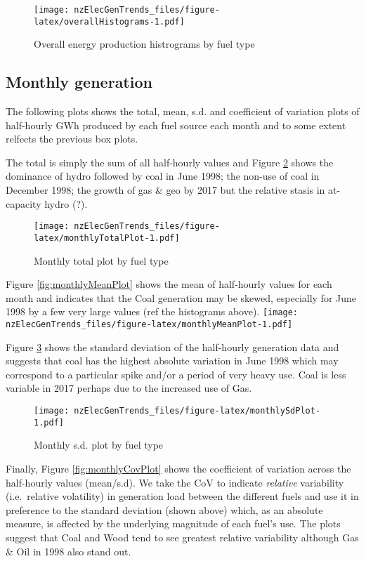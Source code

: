 \documentclass[]{article}
\theoremstyle{definition}
\theoremstyle{definition}
\theoremstyle{definition}
\theoremstyle{remark}
\begin{document}
\begin{figure}
\centering
\texttt{[image: nzElecGenTrends\_files/figure-latex/overallHistograms-1.pdf]}
\caption{\label{fig:overallHistograms}Overall energy production histrograms
by fuel type}
\end{figure}

\subsection{Monthly generation}\label{monthly-generation}

The following plots shows the total, mean, s.d. and coefficient of
variation plots of half-hourly GWh produced by each fuel source each
month and to some extent relfects the previous box plots.

The total is simply the sum of all half-hourly values and Figure
\ref{fig:monthlyTotalPlot} shows the dominance of hydro followed by coal
in June 1998; the non-use of coal in December 1998; the growth of gas \&
geo by 2017 but the relative stasis in at-capacity hydro (?).

\begin{figure}
\centering
\texttt{[image: nzElecGenTrends\_files/figure-latex/monthlyTotalPlot-1.pdf]}
\caption{\label{fig:monthlyTotalPlot}Monthly total plot by fuel type}
\end{figure}

Figure \ref{fig:monthlyMeanPlot} shows the mean of half-hourly values
for each month and indicates that the Coal generation may be skewed,
especially for June 1998 by a few very large values (ref the histograms
above).
\texttt{[image: nzElecGenTrends\_files/figure-latex/monthlyMeanPlot-1.pdf]}

Figure \ref{fig:monthlySdPlot} shows the standard deviation of the
half-hourly generation data and suggests that coal has the highest
absolute variation in June 1998 which may correspond to a particular
spike and/or a period of very heavy use. Coal is less variable in 2017
perhaps due to the increased use of Gas.

\begin{figure}
\centering
\texttt{[image: nzElecGenTrends\_files/figure-latex/monthlySdPlot-1.pdf]}
\caption{\label{fig:monthlySdPlot}Monthly s.d. plot by fuel type}
\end{figure}

Finally, Figure \ref{fig:monthlyCovPlot} shows the coefficient of
variation across the half-hourly values (mean/s.d). We take the CoV to
indicate \emph{relative} variability (i.e.~relative volatility) in
generation load between the different fuels and use it in preference to
the standard deviation (shown above) which, as an absolute measure, is
affected by the underlying magnitude of each fuel's use. The plots
suggest that Coal and Wood tend to see greatest relative variability
although Gas \& Oil in 1998 also stand out.
\end{document}
